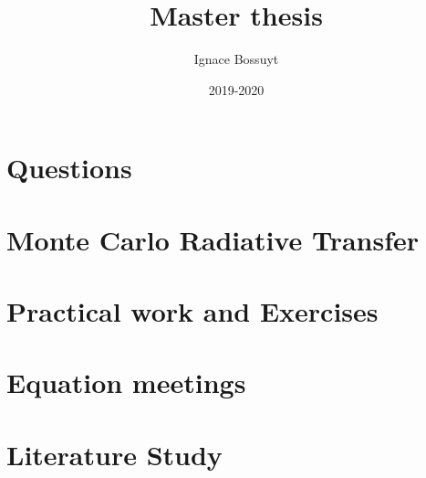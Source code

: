 \documentclass[a4paper,10pt,twoside]{article}
\title{Master thesis}
\author{Ignace Bossuyt}
\date{2019-2020}
\begin{document}
\maketitle
\tableofcontents

\cleardoublepage
\part{Questions}


\cleardoublepage
\part{Monte Carlo Radiative Transfer}


\cleardoublepage
\part{Practical work and Exercises}


\cleardoublepage
\part{Equation meetings}


\cleardoublepage
\part*{Literature Study}


\medskip
\newpage
\printbibliography
\end{document}
